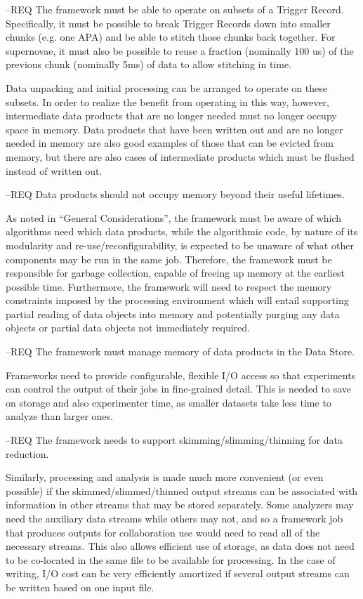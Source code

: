 \documentclass[../main-v1.tex]{subfiles}
\begin{document}
--REQ The framework must be able to operate on subsets of a Trigger Record.  Specifically, it must be possible to break Trigger Records down into smaller chunks (e.g. one APA) and be able to stitch those chunks back together.  For supernovae, it must also be possible to reuse a fraction (nominally 100 us) of the previous chunk (nominally 5ms) of data to allow stitching in time.

Data unpacking and initial processing can be arranged to operate on these subsets.  In order to realize the benefit from operating in this way, however, intermediate data products that are no longer needed must no longer occupy space in memory.  Data products that have been written out and are no longer needed in memory are also good examples of those that can be evicted from memory, but there are also cases of intermediate products which must be flushed instead of written out.

--REQ Data products should not occupy memory beyond their useful lifetimes.

As noted in “General Considerations”, the framework must be aware of which algorithms need which data products, while the algorithmic code, by nature of its modularity and re-use/reconfigurability, is expected to be unaware of what other components may be run in the same job.  Therefore, the framework must be responsible for garbage collection, capable of freeing up memory at the earliest possible time.  Furthermore, the framework will need to respect the memory constraints imposed by the processing environment which will entail supporting partial reading of data objects into memory and potentially purging any data objects or partial data objects not immediately required.

--REQ The framework must manage memory of data products in the Data Store.

Frameworks need to provide configurable, flexible I/O access so that experiments can control the output of their jobs in fine-grained detail.  This is needed to save on storage and also experimenter time, as smaller datasets take less time to analyze than larger ones.
 
--REQ The framework needs to support skimming/slimming/thinning for data reduction.

Similarly, processing and analysis is made much more convenient (or even possible) if the skimmed/slimmed/thinned output streams can be associated with information in other streams that may be stored separately.  Some analyzers may need the auxiliary data streams while others may not, and so a framework job that produces outputs for collaboration use would need to read all of the necessary streams.  This also allows efficient use of storage, as data does not need to be co-located in the same file to be available for processing.  In the case of writing, I/O cost can be very efficiently amortized if several output streams can be written based on one input file.
\end{document}
